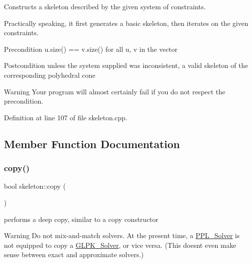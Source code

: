 Constructs a skeleton described by the given system of constraints. 

Practically speaking, it first generates a basic skeleton, then iterates on the given constraints. \begin{DoxyPrecond}{Precondition}
{\ttfamily u.\+size() == v.\+size()} for all {\ttfamily u}, {\ttfamily v} in the vector 
\end{DoxyPrecond}
\begin{DoxyPostcond}{Postcondition}
unless the system supplied was inconsistent, a valid skeleton of the corresponding polyhedral cone 
\end{DoxyPostcond}
\begin{DoxyWarning}{Warning}
Your program will almost certainly fail if you do not respect the precondition. 
\end{DoxyWarning}


Definition at line 107 of file skeleton.\+cpp.



\subsection{Member Function Documentation}
\mbox{\label{classskeleton_a42d30b92f27936eab11d0fa4f0cc10b4}} 
\subsubsection{\texorpdfstring{copy()}{copy()}}
{\footnotesize\ttfamily bool skeleton\+::copy (\begin{DoxyParamCaption}\item[{const \hyperlink{class_l_p___solver}{L\+P\+\_\+\+Solver} $\ast$}]{ }\end{DoxyParamCaption})\hspace{0.3cm}{\ttfamily [virtual]}}



performs a deep copy, similar to a copy constructor 

\begin{DoxyWarning}{Warning}
Do not mix-\/and-\/match solvers. At the present time, a \hyperlink{class_p_p_l___solver}{P\+P\+L\+\_\+\+Solver} is not equipped to copy a \hyperlink{class_g_l_p_k___solver}{G\+L\+P\+K\+\_\+\+Solver}, or vice versa. (This doesn\textquotesingle{}t even make sense between exact and approximate solvers.) 
\end{DoxyWarning}


